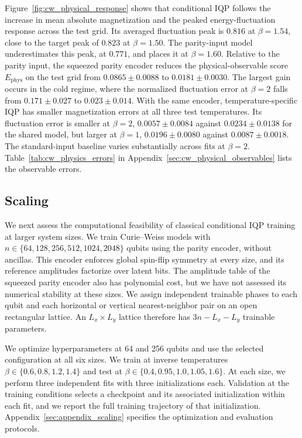 \documentclass[pra,aps,10pt,twocolumn,floatfix,superscriptaddress, notitlepage,longbibliography]{revtex4-2}
\begin{document}
Figure~\ref{fig:cw_physical_response} shows that conditional IQP follows the increase in mean absolute magnetization and the peaked energy-fluctuation response across the test grid. Its averaged fluctuation peak is $0.816$ at $\beta=1.54$, close to the target peak of $0.823$ at $\beta=1.50$. The parity-input model underestimates this peak, at $0.771$, and places it at $\beta=1.60$. Relative to the parity input, the squeezed parity encoder reduces the physical-observable score $E_{\mathrm{phys}}$ on the test grid from $0.0865\pm0.0088$ to $0.0181\pm0.0030$. The largest gain occurs in the cold regime, where the normalized fluctuation error at $\beta=2$ falls from $0.171\pm0.027$ to $0.023\pm0.014$. With the same encoder, temperature-specific IQP has smaller magnetization errors at all three test temperatures. Its fluctuation error is smaller at $\beta=2$, $0.0057\pm0.0084$ against $0.0234\pm0.0138$ for the shared model, but larger at $\beta=1$, $0.0196\pm0.0080$ against $0.0087\pm0.0018$. The standard-input baseline varies substantially across fits at $\beta=2$. Table~\ref{tab:cw_physics_errors} in Appendix~\ref{sec:cw_physical_observables} lists the observable errors.

\subsection{Scaling}
\label{sec:scaling}

We next assess the computational feasibility of classical conditional IQP training at larger system sizes. We train Curie--Weiss models with $n\in\{64,128,256,512,1024,2048\}$ qubits using the parity encoder, without ancillas. This encoder enforces global spin-flip symmetry at every size, and its reference amplitudes factorize over latent bits. The amplitude table of the squeezed parity encoder also has polynomial cost, but we have not assessed its numerical stability at these sizes. We assign independent trainable phases to each qubit and each horizontal or vertical nearest-neighbor pair on an open rectangular lattice. An $L_x\times L_y$ lattice therefore has $3n-L_x-L_y$ trainable parameters.

We optimize hyperparameters at 64 and 256 qubits and use the selected configuration at all six sizes. We train at inverse temperatures $\beta\in\{0.6,0.8,1.2,1.4\}$ and test at $\beta\in\{0.4,0.95,1.0,1.05,1.6\}$. At each size, we perform three independent fits with three initializations each. Validation at the training conditions selects a checkpoint and its associated initialization within each fit, and we report the full training trajectory of that initialization. Appendix~\ref{sec:appendix_scaling} specifies the optimization and evaluation protocols.
\end{document}
